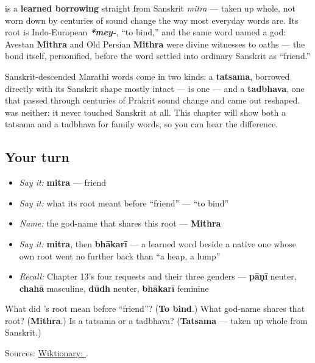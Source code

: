 \begin{cousinweb}
\textbf{} is a \textbf{learned borrowing} straight from Sanskrit \textbf{} \emph{mitra} — taken up whole, not worn down by centuries of sound change the way most everyday words are. Its root is Indo-European \emph{\textbf{*mey-}}, \textquotedblleft{}to bind,\textquotedblright{} and the same word named a god: Avestan \textbf{Mithra} and Old Persian \textbf{Mithra} were divine witnesses to oaths — the bond itself, personified, before the word settled into ordinary Sanskrit as \textquotedblleft{}friend.\textquotedblright{}
\end{cousinweb}

\begin{grammarlens}[title={Grammar Lens: taken up whole, not worn down}]
Sanskrit-descended Marathi words come in two kinds: a \textbf{tatsama}, borrowed directly with its Sanskrit shape mostly intact — \textbf{} is one — and a \textbf{tadbhava}, one that passed through centuries of Prakrit sound change and came out reshaped. \textbf{} was neither: it never touched Sanskrit at all. This chapter will show both a tatsama and a tadbhava for family words, so you can hear the difference.
\end{grammarlens}

\subsection*{Your turn}
\begin{itemize}
\raggedright
  \item \emph{Say it:} \textbf{mitra} — friend
  \item \emph{Say it:} what its root meant before \textquotedblleft{}friend\textquotedblright{} — \textquotedblleft{}to bind\textquotedblright{}
  \item \emph{Name:} the god-name that shares this root — \textbf{Mithra}
  \item \emph{Say it:} \textbf{mitra}, then \textbf{bhākarī} — a learned word beside a native one whose own root went no further back than \textquotedblleft{}a heap, a lump\textquotedblright{}
  \item \emph{Recall:} Chapter 13's four requests and their three genders — \textbf{pāṇī} neuter, \textbf{chahā} masculine, \textbf{dūdh} neuter, \textbf{bhākarī} feminine
\end{itemize}

\begin{tcolorbox}[breakable,colback=teal!4,colframe=teal!35!black,title={Before you move on}]
What did \textbf{}'s root mean before \textquotedblleft{}friend\textquotedblright{}? (\textbf{To bind}.) What god-name shares that root? (\textbf{Mithra}.) Is \textbf{} a tatsama or a tadbhava? (\textbf{Tatsama} — taken up whole from Sanskrit.)

Sources: \href{https://en.wiktionary.org/wiki/\%E0\%A4\%AE\%E0\%A4\%BF\%E0\%A4\%A4\%E0\%A5\%8D\%E0\%A4\%B0}{Wiktionary: }.
\end{tcolorbox}
